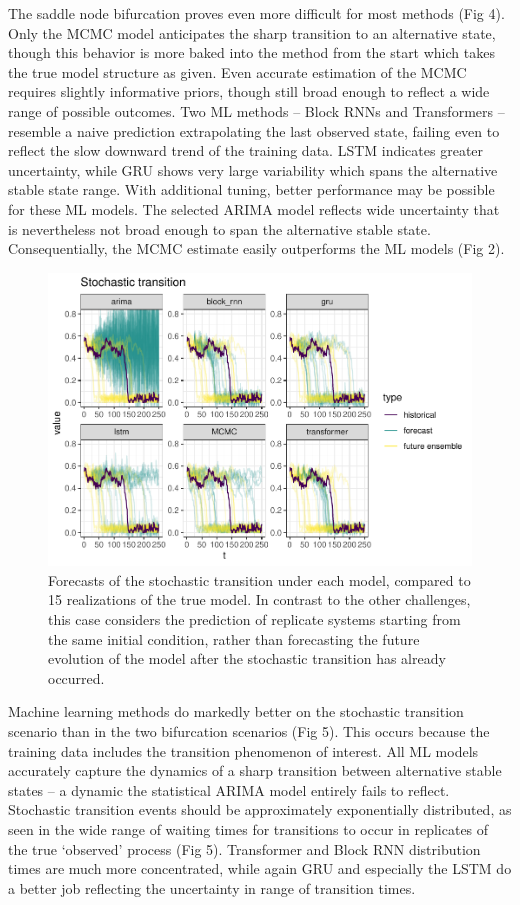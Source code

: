 \documentclass{article}
\begin{document}
The saddle node bifurcation proves even more difficult for most methods
(Fig 4). Only the MCMC model anticipates the sharp transition to an
alternative state, though this behavior is more baked into the method
from the start which takes the true model structure as given. Even
accurate estimation of the MCMC requires slightly informative priors,
though still broad enough to reflect a wide range of possible outcomes.
Two ML methods -- Block RNNs and Transformers -- resemble a naive
prediction extrapolating the last observed state, failing even to
reflect the slow downward trend of the training data. LSTM indicates
greater uncertainty, while GRU shows very large variability which spans
the alternative stable state range. With additional tuning, better
performance may be possible for these ML models. The selected ARIMA
model reflects wide uncertainty that is nevertheless not broad enough to
span the alternative stable state. Consequentially, the MCMC estimate
easily outperforms the ML models (Fig 2).

\begin{figure}
\centering
\includegraphics{manuscript_files/figure-latex/figure5-1.pdf}
\caption{Forecasts of the stochastic transition under each model,
compared to 15 realizations of the true model. In contrast to the other
challenges, this case considers the prediction of replicate systems
starting from the same initial condition, rather than forecasting the
future evolution of the model after the stochastic transition has
already occurred.}
\end{figure}

Machine learning methods do markedly better on the stochastic transition
scenario than in the two bifurcation scenarios (Fig 5). This occurs
because the training data includes the transition phenomenon of
interest. All ML models accurately capture the dynamics of a sharp
transition between alternative stable states -- a dynamic the
statistical ARIMA model entirely fails to reflect. Stochastic transition
events should be approximately exponentially distributed, as seen in the
wide range of waiting times for transitions to occur in replicates of
the true `observed' process (Fig 5). Transformer and Block RNN
distribution times are much more concentrated, while again GRU and
especially the LSTM do a better job reflecting the uncertainty in range
of transition times.
\end{document}
